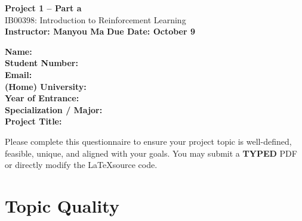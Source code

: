 \documentclass[12pt,a4paper]{article}
\begin{document}
\begin{center}
    {\LARGE \textbf{Project 1 – Part a}} \\[6pt]
    {\large IB00398: Introduction to Reinforcement Learning} \\[3pt]
    \textbf{Instructor: Manyou Ma} \quad \textbf{Due Date: October 9}\\ [3pt]
\end{center}

\vspace{1em}

\noindent

\begin{tcolorbox}[colback=white,colframe=black,boxrule=0.6pt,arc=2pt]
\textbf{Name:} \hspace{8cm} \\[6pt]
\textbf{Student Number:} \hspace{6cm} \\[6pt]
\textbf{Email:} \hspace{8.2cm} \\[6pt]
\textbf{(Home) University:} \hspace{6.5cm} \\[6pt]
\textbf{Year of Entrance:} \hspace{6.5cm} \\[6pt]
\textbf{Specialization / Major:} \hspace{5.6cm} \\[6pt]
\textbf{Project Title:} \hspace{7.2cm}
\end{tcolorbox}

\vspace{1em}
\noindent
Please complete this questionnaire to ensure your project topic is well-defined, feasible, unique, and aligned with your goals. You may submit a \textbf{TYPED} PDF or directly modify the \LaTeX source code.  





\section*{Topic Quality}
\end{document}
